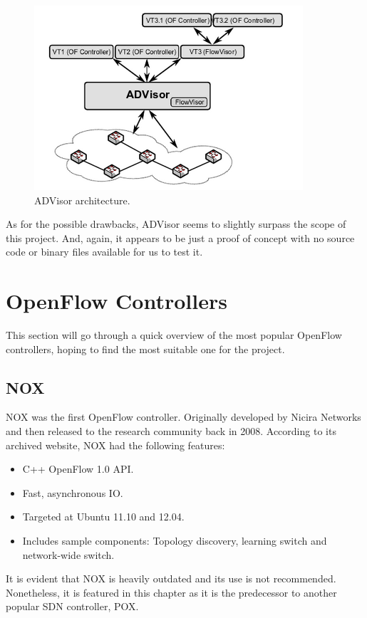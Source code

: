 \begin{figure}
  \centering
  \includegraphics[width=0.8\linewidth]{imagenes/StateOfTheArt/ADvisor_architecture.png}
  \caption[ADVisor architecture.]{ADVisor architecture\cite{advisor}.}
  \label{fig:advisor}
\end{figure}

As for the possible drawbacks, ADVisor seems to slightly surpass the scope of this project. And, again, it appears to be just a proof of concept with no source code or binary files available for us to test it.

\section{OpenFlow Controllers}
This section will go through a quick overview of the most popular OpenFlow controllers, hoping to find the most suitable one for the project.

\subsection{NOX}
NOX was the first OpenFlow controller. Originally developed by Nicira Networks and then released to the research community back in 2008. According to its archived website\cite{nox}, NOX had the following features: 
\begin{itemize}
    \item C++ OpenFlow 1.0 API.
    \item Fast, asynchronous IO.
    \item Targeted at Ubuntu 11.10 and 12.04.
    \item Includes sample components: Topology discovery, learning switch and network-wide switch.
\end{itemize}

It is evident that NOX is heavily outdated and its use is not recommended. Nonetheless, it is featured in this chapter as it is the predecessor to another popular SDN controller, POX.

